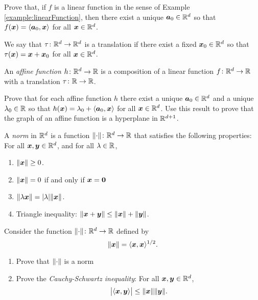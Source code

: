 \begin{problem}\label{problem:linearFunction}
Prove that, if $f$ is a linear function in the sense of Example \ref{example:linearFunction}, then there exist a unique $\boldsymbol{a}_0 \in \mathbb{R}^d$ so that $f(\boldsymbol{x})=\langle \boldsymbol{a}_0, \boldsymbol{x} \rangle$ for all $\boldsymbol{x} \in \mathbb{R}^d$.
\end{problem}

\begin{problem}\label{problem:affineFunction}
We say that $\tau\colon \mathbb{R}^d \to \mathbb{R}^d$ is a translation if there exist a fixed $\boldsymbol{x}_0 \in \mathbb{R}^d$ so that $\tau(\boldsymbol{x}) = \boldsymbol{x} + \boldsymbol{x}_0$ for all $\boldsymbol{x} \in \mathbb{R}^d$.

An \emph{affine function} $h\colon \mathbb{R}^d \to \mathbb{R}$ is a composition of a linear function $f\colon \mathbb{R}^d \to \mathbb{R}$ with a translation $\tau\colon \mathbb{R} \to \mathbb{R}$.

Prove that for each affine function $h$ there exist a unique $\boldsymbol{a}_0 \in \mathbb{R}^d$ and a unique $\lambda_0 \in \mathbb{R}$ so that $h(\boldsymbol{x}) = \lambda_0 + \langle \boldsymbol{a}_0, \boldsymbol{x} \rangle$ for all $\boldsymbol{x} \in \mathbb{R}^d$.  Use this result to prove that the graph of an affine function is a hyperplane in $\mathbb{R}^{d+1}$.
\end{problem}

\begin{example}[Norms]\label{example:norm}
A \emph{norm} in $\mathbb{R}^d$ is a function $\lVert \cdot \rVert \colon \mathbb{R}^d \to \mathbb{R}$ that satisfies the following properties:
For all $\boldsymbol{x}, \boldsymbol{y} \in \mathbb{R}^d$, and for all $\lambda \in \mathbb{R}$,
\begin{enumerate}
	\item $\lVert \boldsymbol{x} \rVert \geq 0$.
	\item $\lVert \boldsymbol{x} \rVert = 0$ if and only if $\boldsymbol{x} = \boldsymbol{0}$
	\item $\lVert  \lambda \boldsymbol{x} \rVert = \lvert \lambda \rvert \lVert \boldsymbol{x} \rVert$.
	\item Triangle inequality: $\lVert \boldsymbol{x} + \boldsymbol{y} \rVert \leq \lVert \boldsymbol{x} \rVert + \lVert \boldsymbol{y} \rVert$.
\end{enumerate}
\end{example}

\begin{problem}\label{problem:norm}
Consider the function $\lVert \cdot \rVert \colon \mathbb{R}^d \to \mathbb{R}$ defined by 
\begin{equation*}
\lVert \boldsymbol{x} \rVert = \langle \boldsymbol{x}, \boldsymbol{x} \rangle^{1/2}.
\end{equation*}
\begin{enumerate}
	\item Prove that $\lVert \cdot \rVert$ is a norm
	\item Prove the \emph{Cauchy-Schwartz inequality}: For all $\boldsymbol{x}, \boldsymbol{y} \in \mathbb{R}^d$, 
	\begin{equation*}
	\big\lvert \langle \boldsymbol{x}, \boldsymbol{y} \rangle \big\rvert \leq \lVert \boldsymbol{x} \rVert \lVert \boldsymbol{y} \rVert.
	\end{equation*}
\end{enumerate}
\end{problem}


